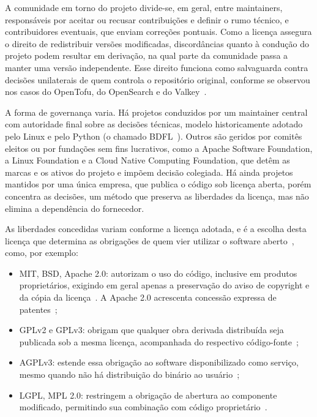 A comunidade em torno do projeto divide-se, em geral, entre maintainers, responsáveis por aceitar ou recusar contribuições e definir o rumo técnico, e contribuidores eventuais, que enviam correções pontuais. Como a licença assegura o direito de redistribuir versões modificadas, discordâncias quanto à condução do projeto podem resultar em derivação, na qual parte da comunidade passa a manter uma versão independente. Esse direito funciona como salvaguarda contra decisões unilaterais de quem controla o repositório original, conforme se observou nos casos do OpenTofu, do OpenSearch e do Valkey~\cite{opentofu2023}.

A forma de governança varia. Há projetos conduzidos por um maintainer central com autoridade final sobre as decisões técnicas, modelo historicamente adotado pelo Linux e pelo Python (o chamado BDFL~\cite{bdfl}). Outros são geridos por comitês eleitos ou por fundações sem fins lucrativos, como a Apache Software Foundation, a Linux Foundation e a Cloud Native Computing Foundation, que detêm as marcas e os ativos do projeto e impõem decisão colegiada. Há ainda projetos mantidos por uma única empresa, que publica o código sob licença aberta, porém concentra as decisões, um método que preserva as liberdades da licença, mas não elimina a dependência do fornecedor.

As liberdades concedidas variam conforme a licença adotada, e é a escolha desta licença que determina as obrigações de quem vier utilizar o software aberto~\cite{fsf2026licencas}, como, por exemplo:

\begin{itemize} 
	\item MIT, BSD, Apache 2.0: autorizam o uso do código, inclusive em produtos proprietários, exigindo em geral apenas a preservação do aviso de copyright e da cópia da licença~\cite{fsf2026licencas}. A Apache 2.0 acrescenta concessão expressa de patentes~\cite{fsf2026licencas};
	\item GPLv2 e GPLv3: obrigam que qualquer obra derivada distribuída seja publicada sob a mesma licença, acompanhada do respectivo código-fonte~\cite{fsf2026licencas};
	\item AGPLv3: estende essa obrigação ao software disponibilizado como serviço, mesmo quando não há distribuição do binário ao usuário~\cite{fsf2026licencas};
	\item LGPL, MPL 2.0: restringem a obrigação de abertura ao componente modificado, permitindo sua combinação com código proprietário~\cite{fsf2026licencas}.
\end{itemize}

